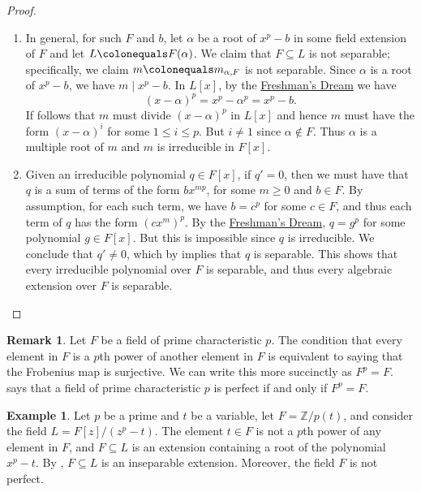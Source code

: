 \documentclass[12pt]{report}
\numberwithin{equation}{section}
\numberwithin{theorem}{chapter}
\theoremstyle{definition}
\newtheorem{example}[theorem]{Example}
\newtheorem*{basic properties}{Basic Properties}
\newtheorem*{Important Remark}{Important Remark}
\newtheorem{remark}[theorem]{Remark}
\newcommand{\Z}{\mathbb{Z}}
\begin{document}
\begin{proof}$\,$
\begin{enumerate}[label=\alph*),leftmargin=15pt]
\item In general, for such $F$ and $b$, let $\alpha$ be a root of $x^p - b$ in some field extension of $F$ and let $L \colonequals F(\alpha)$. We claim that $F \subseteq L$ is not separable; specifically, we claim $m \colonequals m_{\alpha, F}$ is not separable.
Since $\alpha$ is a root of $x^p - b$, we have $m \mid x^p - b$. In $L[x]$,
by the \hyperref[freshmans dream]{Freshman's Dream} we have
$$(x-\alpha)^p = x^p - \alpha^p = x^p -b.$$
If follows that $m$ must divide $(x-\alpha)^p$ in $L[x]$ and hence $m$ must have the form $(x-\alpha)^i$ for some $1 \leqslant i \leqslant p$. But $i \neq 1$ since $\alpha \notin F$.
Thus $\alpha$ is a multiple root of $m$ and $m$ is irreducible in $F[x]$.


\item Given an irreducible polynomial $q \in F[x]$, if $q' = 0$, then we must have that $q$ is a sum of terms of the form $b x^{mp}$, for some $m \geqslant 0$ and $b \in F$.
By assumption, for each such term, we have $b = c^p$ for some $c \in F$, and thus each term of $q$ has the form $(cx^m)^p$.
By the \hyperref[freshmans dream]{Freshman's Dream}, $q = g^p$ for some polynomial $g \in F[x]$. But this is impossible since $q$ is irreducible. We conclude that $q' \neq 0$, which by  implies that $q$ is separable. This shows that every irreducible polynomial over $F$ is separable, and thus every algebraic extension over $F$ is separable. 
\qedhere
\end{enumerate}
\end{proof}


\begin{remark}
	Let $F$ be a field of prime characteristic $p$.	The condition that every element in $F$ is a $p$th power of another element in $F$ is equivalent to saying that the Frobenius map is surjective. We can write this more succinctly as $F^p = F$.  says that a field of prime characteristic $p$ is perfect if and only if $F^p = F$.
\end{remark}

\begin{example}
	Let $p$ be a prime and $t$ be a variable, let $F = \Z/p(t)$, and consider the field $L = F[z]/(z^p-t)$. The element $t \in F$ is not a $p$th power of any element in $F$, and $F \subseteq L$ is an extension containing a root of the polynomial $x^p-t$. By , $F \subseteq L$ is an inseparable extension. Moreover, the field $F$ is not perfect.
\end{example}
\end{document}
